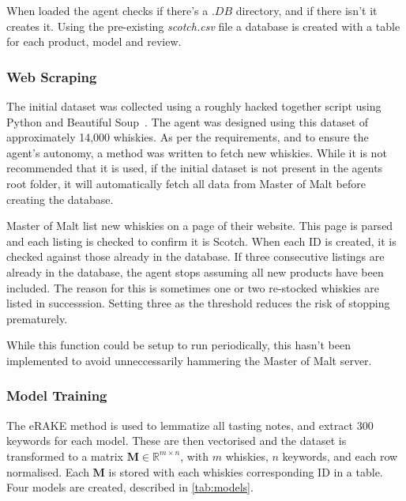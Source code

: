 When loaded the agent checks if there's a $.DB$ directory, and if there isn't it creates it.  Using the pre-existing
\emph{scotch.csv} file a database is created with a table for each product, model and review.

\subsubsection{Web Scraping}\label{sssec:scrape}
The initial dataset was collected using a roughly hacked together script using Python and Beautiful 
Soup~\cite{richardson2007beautiful}. The agent was designed using this dataset of approximately 14,000
whiskies.  As per the requirements, and to ensure the agent's autonomy, a method was written to fetch new
whiskies. While it is not recommended that it is used, if the initial dataset is not present in the agents
root folder, it will automatically fetch all data from Master of Malt before creating the database.

Master of Malt list new whiskies on a page of their website.  This page is parsed and each listing
is checked to confirm it is Scotch.  When each ID is created, it is checked against those already in the
database.  If three consecutive listings are already in the database, the agent stops assuming all new products
have been included. The reason for this is sometimes one or two re-stocked whiskies are listed in successsion.
Setting three as the threshold reduces the risk of stopping prematurely.

While this function could be setup to run periodically, this hasn't been implemented to avoid unneccessarily 
hammering the Master of Malt server.

\subsubsection{Model Training}
The eRAKE method is used to lemmatize all tasting notes, and extract 300 keywords for each model.  These are 
then vectorised and the dataset is transformed to a matrix $\textbf{M} \in \mathbb{R}^{m \times n}$, with $m$ 
whiskies, $n$ keywords, and each row normalised. Each $\textbf{M}$ is stored with each whiskies corresponding ID 
in a table. Four models are created, described in \autoref{tab:models}.

